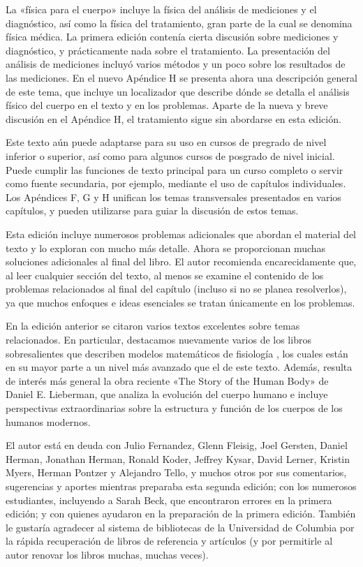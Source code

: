 ﻿\documentclass{book}
\begin{document}
La «física para el cuerpo» incluye la física del análisis de mediciones y el diagnóstico, así como la física del tratamiento, gran parte de la cual se denomina física médica. La primera edición contenía cierta discusión sobre mediciones y diagnóstico, y prácticamente nada sobre el tratamiento. La presentación del análisis de mediciones incluyó varios métodos y un poco sobre los resultados de las mediciones. En el nuevo Apéndice H se presenta ahora una descripción general de este tema, que incluye un localizador que describe dónde se detalla el análisis físico del cuerpo en el texto y en los problemas. Aparte de la nueva y breve discusión en el Apéndice H, el tratamiento sigue sin abordarse en esta edición.

Este texto aún puede adaptarse para su uso en cursos de pregrado de nivel inferior o superior, así como para algunos cursos de posgrado de nivel inicial. Puede cumplir las funciones de texto principal para un curso completo o servir como fuente secundaria, por ejemplo, mediante el uso de capítulos individuales. Los Apéndices F, G y H unifican los temas transversales presentados en varios capítulos, y pueden utilizarse para guiar la discusión de estos temas.

Esta edición incluye numerosos problemas adicionales que abordan el material del texto y lo exploran con mucho más detalle. Ahora se proporcionan muchas soluciones adicionales al final del libro. El autor recomienda encarecidamente que, al leer cualquier sección del texto, al menos se examine el contenido de los problemas relacionados al final del capítulo (incluso si no se planea resolverlos), ya que muchos enfoques e ideas esenciales se tratan únicamente en los problemas.

En la edición anterior se citaron varios textos excelentes sobre temas relacionados. En particular, destacamos nuevamente varios de los libros sobresalientes que describen modelos matemáticos de fisiología \cite{2nd-1, 2nd-2, 2nd-3, 2nd-4, 2nd-6, 2nd-7}, los cuales están en su mayor parte a un nivel más avanzado que el de este texto. Además, resulta de interés más general la obra reciente «The Story of the Human Body» de Daniel E. Lieberman, que analiza la evolución del cuerpo humano e incluye perspectivas extraordinarias sobre la estructura y función de los cuerpos de los humanos modernos.

El autor está en deuda con Julio Fernandez, Glenn Fleisig, Joel Gersten, Daniel Herman, Jonathan Herman, Ronald Koder, Jeffrey Kysar, David Lerner, Kristin Myers, Herman Pontzer y Alejandro Tello, y muchos otros por sus comentarios, sugerencias y aportes mientras preparaba esta segunda edición; con los numerosos estudiantes, incluyendo a Sarah Beck, que encontraron errores en la primera edición; y con quienes ayudaron en la preparación de la primera edición. También le gustaría agradecer al sistema de bibliotecas de la Universidad de Columbia por la rápida recuperación de libros de referencia y artículos (y por permitirle al autor renovar los libros muchas, muchas veces).
\end{document}

